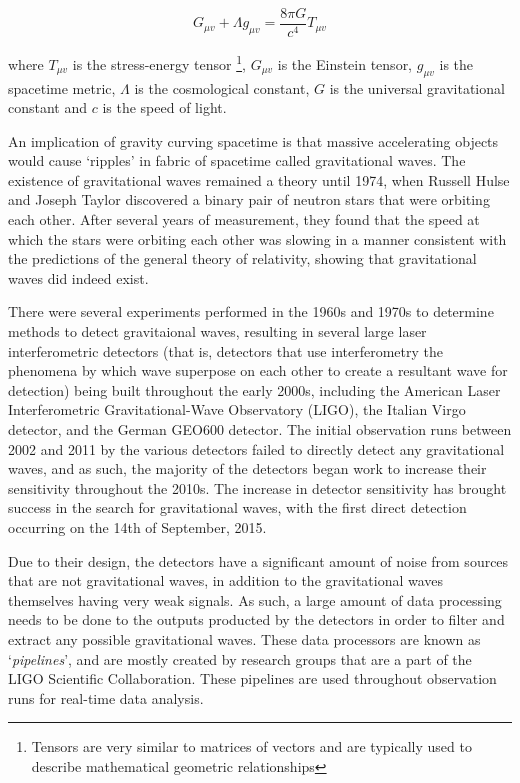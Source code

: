 \documentclass{article}
\begin{document}
\begin{equation}
    G_{\mu{}v} + \Lambda{}g_{\mu{}v} = \dfrac{8\pi{}G}{c^4}T_{\mu{}v}
\end{equation}

where \(T_{\mu{}v}\) is the stress-energy tensor \footnote{Tensors are very similar to matrices of
vectors and are typically used to describe mathematical geometric relationships}, \(G_{\mu{}v}\) is
the Einstein tensor, \(g_{\mu{}v}\) is the spacetime metric, \(\Lambda\) is the cosmological
constant, \(G\) is the universal gravitational constant and \(c\) is the speed of light.

An implication of gravity curving spacetime is that massive accelerating objects would cause
`ripples' in fabric of spacetime called gravitational waves. The existence of gravitational waves
remained a theory until 1974, when Russell Hulse and Joseph Taylor discovered a binary pair of
neutron stars that were orbiting each other. After several years of measurement, they found that
the speed at which the stars were orbiting each other was slowing in a manner consistent with the
predictions of the general theory of relativity, showing that gravitational waves did indeed exist.

There were several experiments performed in the 1960s and 1970s to determine methods to detect
gravitaional waves, resulting in several large laser interferometric detectors (that is, detectors
that use interferometry \textendash{} the phenomena by which wave superpose on each other to create
a resultant wave \textendash{} for detection) being built throughout the early 2000s, including the
American Laser Interferometric Gravitational-Wave Observatory (LIGO), the Italian Virgo detector,
and the German GEO600 detector. The initial observation runs between 2002 and 2011 by the various
detectors failed to directly detect any gravitational waves, and as such, the majority of the
detectors began work to increase their sensitivity throughout the 2010s. The increase in detector
sensitivity has brought success in the search for gravitational waves, with the first direct
detection occurring on the 14th of September, 2015.

Due to their design, the detectors have a significant amount of noise from sources that are not
gravitational waves, in addition to the gravitational waves themselves having very weak signals. As
such, a large amount of data processing needs to be done to the outputs producted by the detectors
in order to filter and extract any possible gravitational waves. These data processors are known as
`\textit{pipelines}', and are mostly created by research groups that are a part of the LIGO
Scientific Collaboration. These pipelines are used throughout observation runs for real-time data
analysis.
\end{document}
